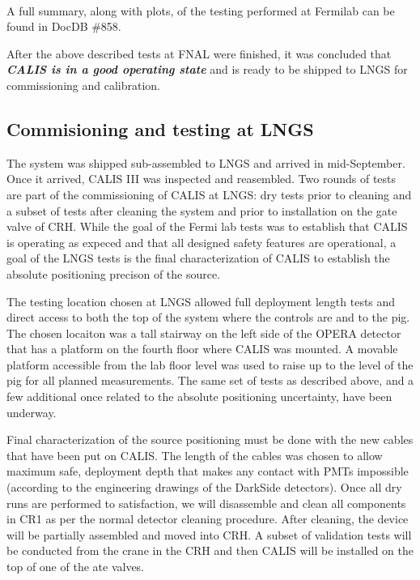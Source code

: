  \paragraph{}
  A full summary, along with plots, of the testing performed at Fermilab can be found in DocDB \#858.  

After the above described tests at FNAL were finished, it was concluded that \textit{\bf CALIS is in a good operating state} and is ready to be shipped to LNGS for commissioning and calibration.


\subsection{Commisioning and testing at LNGS}

 The system was shipped sub-assembled to LNGS and arrived in mid-September. Once it arrived, CALIS III was inspected and reasembled. Two rounds of tests are part of the commissioning of CALIS at LNGS: dry tests prior to cleaning and a subset of tests after cleaning the system and prior to installation on the gate valve of CRH. While the goal of the Fermi lab tests was to establish that CALIS is operating as expeced and that all designed safety features are operational, a  goal of the LNGS tests is the final characterization of CALIS to establish the absolute positioning precison of the source. 

The testing location chosen at LNGS allowed full deployment length tests and direct access to both the top of the system where the controls are and to the pig. The chosen locaiton was a tall stairway on the left side of the OPERA detector that has a platform on the fourth floor where CALIS was mounted. A movable platform accessible from the lab floor level was used to raise up to the level of the pig for all planned measurements.   The same set of tests as described above, and a few additional once related to the absolute positioning uncertainty,  have been underway.

 Final characterization of the source positioning must be done with the new cables that have been put on CALIS. The length of the cables was chosen to allow maximum safe, deployment depth that makes any contact with PMTs impossible (according to the engineering drawings of the DarkSide detectors).   Once all dry runs are performed to satisfaction, we will disassemble and clean all components in CR1 as per the normal detector cleaning procedure. After cleaning, the device will be partially assembled and moved into CRH. A subset of validation tests will be conducted from the crane in the CRH and then CALIS will be installed on the top of one of the ate valves.

